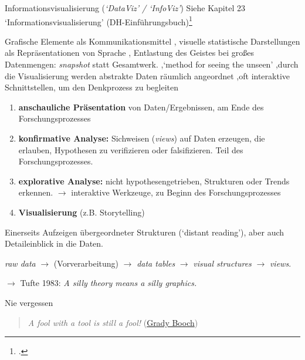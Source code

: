 \documentclass[10pt]{beamer}
\begin{document}
\begin{frame}[allowframebreaks]{Informationsvisualisierung (\emph{`DataViz' / `InfoViz'})}
Siehe Kapitel 23 `Informationsvisualisierung' (DH-Einführungsbuch)\footcite[vgl.][]{DHIntroRehbeinInfoviz}


Grafische Elemente als Kommunikationsmittel \sep
visuelle statistische Darstellungen als Repräsentationen von Sprache \sep
Entlastung des Geistes bei großes Datenmengen: \emph{snapshot} statt Gesamtwerk. \sep `method for seeing the unseen' \sep durch die Visualisierung werden abstrakte Daten räumlich angeordnet \sep oft interaktive Schnittstellen, um den Denkprozess zu begleiten 

\framebreak
{}
\begin{enumerate}
\item \textbf{anschauliche Präsentation} von Daten/Ergebnissen, am Ende des Forschungsprozesses
\item \textbf{konfirmative Analyse:} Sichweisen (\emph{views}) auf Daten erzeugen, die erlauben, Hypothesen zu verifizieren oder falsifizieren. Teil des Forschungsprozesses.
\item \textbf{explorative Analyse:} nicht hypothesengetrieben, Strukturen oder Trends erkennen. $\to$ interaktive Werkzeuge, zu Beginn des Forschungsprozesses
\item \textbf{Visualisierung} (z.B. Storytelling)
\end{enumerate}

 Einerseits Aufzeigen übergeordneter Strukturen (`distant reading'), aber auch Detaileinblick in die Daten.

\emph{raw data} $\to$ (Vorverarbeitung) $\to$ \emph{data tables} $\to$ \emph{visual structures} $\to$ \emph{views}.

$\to$ Tufte 1983: \emph{A silly theory means a silly graphics.}
\end{frame}

\begin{frame}[allowframebreaks]{Nie vergessen}

\begin{quote}\normalsize
        \emph{A fool with a tool is still a fool!} (\href{https://en.wikiquote.org/wiki/Talk:Grady_Booch}{Grady Booch})
    \end{quote}

\end{frame}
\end{document}
